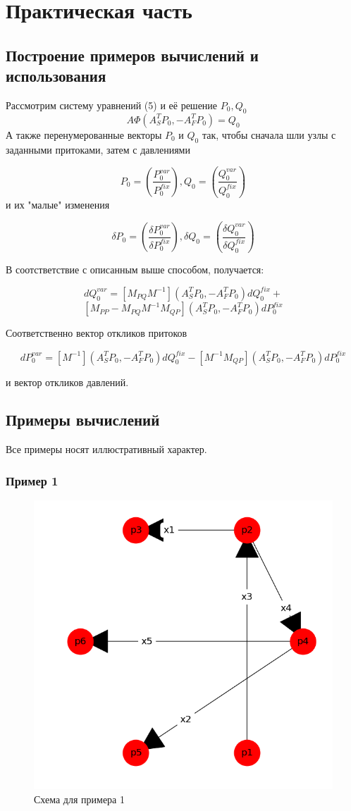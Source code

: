 \chapter{Практическая часть}
\section{Построение примеров вычислений и использования}
Рассмотрим систему уравнений (5) и её решение $ P_0, Q_0 $
$$ A \Phi(A_S^T P_0, -A_F^T P_0) = Q_0 $$
А также перенумерованные векторы $ P_0 $ и $ Q_0 $ так, чтобы сначала шли узлы с заданными притоками, затем с давлениями

$$ P_0 = \left(\frac{P_0^{var}}{P_0^{fix}}\right), Q_0 = \left(\frac{Q_0^{var}}{Q_0^{fix}}\right) $$
и их "малые" изменения

$$ \delta P_0 = \left(\frac{ \delta P_0^{var}}{ \delta P_0^{fix}}\right), \delta Q_0 = \left(\frac{ \delta Q_0^{var}}{ \delta  Q_0^{fix}}\right) $$

В соотстветствие с описанным выше способом, получается:

$$ dQ_0^{var} = [ M_{PQ} M^{-1} ] ( A_S^T P_0, -A_F^T P_0  ) dQ_0^{fix} + $$ $$ [ M_{PP} - M_{PQ} M^{-1} M_{QP} ] ( A_S^T P_0, -A_F^T P_0 ) dP_0^{fix} $$

Соответственно вектор откликов притоков

$$ dP_0^{var} = [M^{-1}](A_S^T P_0, -A_F^T P_0) dQ_0^{fix} - [M^{-1} M_{QP}](A_S^T P_0, -A_F^T P_0) dP_0^{fix} $$

и вектор откликов давлений.
\section{Примеры вычислений}

Все примеры носят иллюстративный характер.

\subsection{Пример 1}

\begin{figure}[h]
  \center\includegraphics[width=0.6\linewidth]{picts/example1/1.png}
  \caption{Схема для примера 1}
  \label{fig:example_1}
\end{figure}

